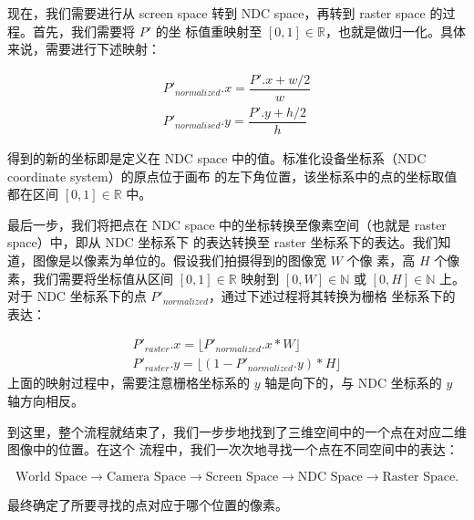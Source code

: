 \documentclass[12pt]{article}
\begin{document}
\indent{}现在，我们需要进行从 screen space 转到 NDC space，再转到 raster space 的过程。首先，我们需要将 $P'$ 的坐
标值重映射至 $[0,1]\in \mathbb{R}$，也就是做归一化。具体来说，需要进行下述映射：

\begin{displaymath}
\begin{array}{l}
P'_{normalized}.x = \dfrac{P'.x + w / 2}{ w }\\
P'_{normalised}.y = \dfrac{P'.y + h / 2}{ h }
\end{array}
\end{displaymath}

\noindent{}得到的新的坐标即是定义在 NDC space 中的值。标准化设备坐标系（NDC coordinate system）的原点位于画布
的左下角位置，该坐标系中的点的坐标取值都在区间 $[0,1]\in \mathbb{R}$ 中。

\indent{}最后一步，我们将把点在 NDC space 中的坐标转换至像素空间（也就是 raster space）中，即从 NDC 坐标系下
的表达转换至 raster 坐标系下的表达。我们知道，图像是以像素为单位的。假设我们拍摄得到的图像宽 $W$ 个像
素，高 $H$ 个像素，我们需要将坐标值从区间 $[0,1]\in \mathbb{R}$ 映射到 $[0, W]\in \mathbb{N}$ 或
$[0, H]\in \mathbb{N}$ 上。对于 NDC 坐标系下的点 $P'_{normalized}$，通过下述过程将其转换为栅格
坐标系下的表达：

\begin{displaymath}
\begin{array}{l}
P'_{raster}.x = \lfloor{ P'_{normalized}.x * W}\rfloor\\
P'_{raster}.y = \lfloor{ (1 - P'_{normalized}.y) * H}\rfloor
\end{array}
\end{displaymath}
\noindent{}上面的映射过程中，需要注意栅格坐标系的 $y$ 轴是向下的，与 NDC 坐标系的 $y$ 轴方向相反。

\indent{}到这里，整个流程就结束了，我们一步步地找到了三维空间中的一个点在对应二维图像中的位置。在这个
流程中，我们一次次地寻找一个点在不同空间中的表达：

\begin{displaymath}
\text{World Space} \rightarrow \text{Camera Space} \rightarrow \text{Screen Space}
\rightarrow \text{NDC Space} \rightarrow \text{Raster Space}.
\end{displaymath}

\noindent{}最终确定了所要寻找的点对应于哪个位置的像素。
\end{document}
